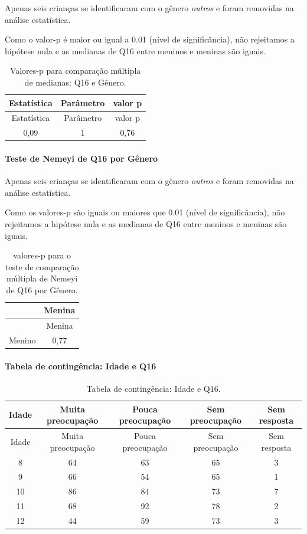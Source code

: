 \documentclass[]{article}
\let\oldparagraph\paragraph
\renewcommand{\paragraph}[1]{\oldparagraph{#1}\mbox{}}
\begin{document}
Apenas seis crianças se identificaram com o gênero \emph{outros} e foram removidas na análise estatística.

Como o valor-p é maior ou igual a 0.01 (nível de significância), não rejeitamos a hipótese nula e as medianas de Q16 entre meninos e meninas são iguais.

\begin{longtable}[]{@{}ccc@{}}
\caption{\label{tab:unnamed-chunk-148}Valores-p para comparação múltipla de medianas: Q16 e Gênero.}\tabularnewline
\toprule
Estatística & Parâmetro & valor p\tabularnewline
\midrule
\endfirsthead
\toprule
Estatística & Parâmetro & valor p\tabularnewline
\midrule
\endhead
0,09 & 1 & 0,76\tabularnewline
\bottomrule
\end{longtable}

\hypertarget{teste-de-nemeyi-de-q16-por-guxeanero}{%
\paragraph{Teste de Nemeyi de Q16 por Gênero}\label{teste-de-nemeyi-de-q16-por-guxeanero}}

Apenas seis crianças se identificaram com o gênero \emph{outros} e foram removidas na análise estatística.

Como os valores-p são iguais ou maiores que 0.01 (nível de significância), não rejeitamos a hipótese nula e as medianas de Q16 entre meninos e meninas são iguais.

\begin{longtable}[]{@{}lc@{}}
\caption{\label{tab:unnamed-chunk-150}valores-p para o teste de comparação múltipla de Nemeyi de Q16 por Gênero.}\tabularnewline
\toprule
& Menina\tabularnewline
\midrule
\endfirsthead
\toprule
& Menina\tabularnewline
\midrule
\endhead
Menino & 0,77\tabularnewline
\bottomrule
\end{longtable}

\cleardoublepage

\hypertarget{tabela-de-continguxeancia-idade-e-q16}{%
\paragraph{Tabela de contingência: Idade e Q16}\label{tabela-de-continguxeancia-idade-e-q16}}

\begin{longtable}[]{@{}ccccc@{}}
\caption{\label{tab:unnamed-chunk-151}Tabela de contingência: Idade e Q16.}\tabularnewline
\toprule
Idade & Muita preocupação & Pouca preocupação & Sem preocupação & Sem resposta\tabularnewline
\midrule
\endfirsthead
\toprule
Idade & Muita preocupação & Pouca preocupação & Sem preocupação & Sem resposta\tabularnewline
\midrule
\endhead
8 & 64 & 63 & 65 & 3\tabularnewline
9 & 66 & 54 & 65 & 1\tabularnewline
10 & 86 & 84 & 73 & 7\tabularnewline
11 & 68 & 92 & 78 & 2\tabularnewline
12 & 44 & 59 & 73 & 3\tabularnewline
\bottomrule
\end{longtable}
\end{document}
